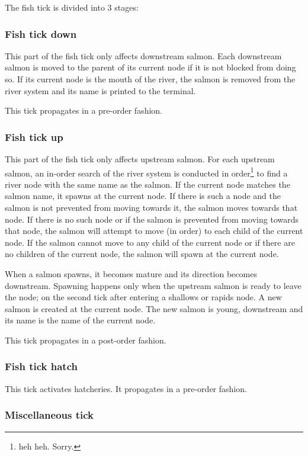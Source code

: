 \documentclass[10pt]{article}
\begin{document}
The fish tick is divided into 3 stages:

\subsubsection{Fish tick down}

This part of the fish tick only affects downstream salmon. Each downstream salmon is moved to the parent of its current
node if it is not blocked from doing so. If its current node is the mouth of the river, the salmon is removed from the
river system and its name is printed to the terminal.

This tick propagates in a pre-order fashion.

\subsubsection{Fish tick up}

This part of the fish tick only affects upstream salmon. For each upstream salmon, an in-order search of the river system
is conducted in order\footnote{heh heh. Sorry.} to find a river node with the same name as the salmon.
If the current node matches the salmon name, it spawns at the current node.
If there is such a node and the salmon is not prevented from moving towards it, the salmon moves towards that node.
If there is no such node or if the salmon is prevented from moving towards that node, the salmon will attempt to move (in order) to each child of the current node.
If the salmon cannot move to any child of the current node or if there are no children of the current node, the salmon will spawn at the current node.

When a salmon spawns, it becomes mature and its direction becomes downstream.
Spawning happens only when the upstream salmon is ready to leave the node; on the second tick after entering a shallows or rapids node.
A new salmon is created at the current node.
The new salmon is young, downstream and its name is the name of the current node.

This tick propagates in a post-order fashion.

\subsubsection{Fish tick hatch}

This tick activates hatcheries. It propagates in a pre-order fashion.

\subsubsection{Miscellaneous tick}
\end{document}
